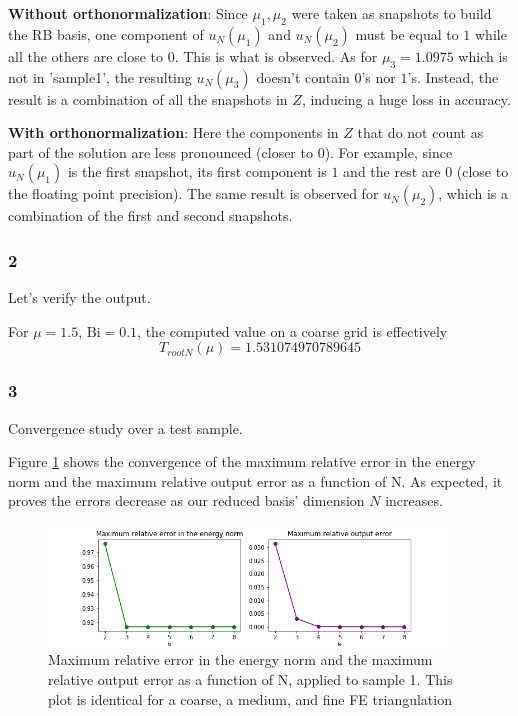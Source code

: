 \documentclass[
	english,
	11pt, %
]{fphw}
\newcommand{\bi}{\text{Bi}}
\begin{document}
\textbf{Without orthonormalization}: Since $\mu_1, \mu_2$ were taken as snapshots to build the RB basis, one component of $u_N(\mu_1)$ and $u_N(\mu_2)$ must be equal to $1$ while all the others are close to $0$. This is what is observed. As for $\mu_3 = 1.0975$ which is not in 'sample1', the resulting $u_N(\mu_3)$ doesn't contain $0$'s nor $1$'s. Instead, the result is a combination of all the snapshots in $Z$, inducing a huge loss in accuracy.

\textbf{With orthonormalization}: Here the components in $Z$ that do not count as part of the solution are less pronounced (closer to $0$). For example, since $u_N(\mu_1)$ is the first snapshot, its first component is $1$ and the rest are $0$ (close to the floating point precision). The same result is observed for $u_N(\mu_2)$, which is a combination of the first and second snapshots.

\subsubsection*{2}
\begin{problem}
	Let's verify the output.
\end{problem}


For $\mu = 1.5$, $\bi = 0.1$, the computed value on a coarse grid is effectively $$T_{rootN}(\mu)=1.531074970789645$$


\subsubsection*{3}
\begin{problem}
	Convergence study over a test sample.
\end{problem}


Figure \cref{fig:sample1Error} shows the convergence of the maximum
relative error in the energy norm and the maximum relative
output error as a function of N. As expected, it proves the errors decrease as our reduced basis' dimension $N$ increases.

\begin{figure}[H]
	\centering
	\includegraphics[width=0.95\textwidth]{sample1Error.png}
	\caption{Maximum relative error in the energy norm and the maximum relative output error as a function of N, applied to sample 1. This plot is identical for a coarse, a medium, and fine FE triangulation}
	\label{fig:sample1Error}
\end{figure}
\end{document}

